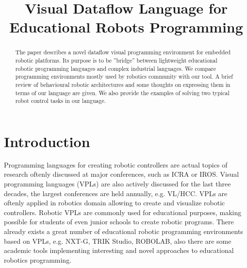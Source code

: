 \documentclass[conference,compsoc]{IEEEtran}
\begin{document}
\title{Visual Dataflow Language for Educational Robots Programming}

\author{
	\and

}

\maketitle



\begin{abstract}
The paper describes a novel dataflow visual programming environment for embedded robotic platforms. Its purpose is to be ''bridge'' between lightweight educational robotic programming languages and complex industrial languages. We compare programming environments mostly used by robotics community with our tool. A brief review of behavioural robotic architectures and some thoughts on expressing them in terms of our language are given. We also provide the examples of solving two typical robot control tasks in our language.
\end{abstract}

\section{Introduction}

Programming languages for creating robotic controllers are actual topics of research oftenly discussed at major conferences, such as ICRA\cite{Icra} or IROS\cite{Iros2016}. Visual programming languages (VPLs) are also actively discussed for the last three decades, the largest conferences are held annually, e.g. VL/HCC\cite{VLHCC}. VPLs are oftenly applied in robotics domain\cite{banyasad2000visual,simpson2006mobile,simpson2008visual,posso2011process,diprose2011ruru} allowing to create and visualize robotic controllers. Robotic VPLs are commonly used for educational purposes, making possible for students of even junior schools to create robotic programs. There already exists a great number of educational robotic programming environments based on VPLs, e.g. NXT-G\cite{nxtg}, TRIK Studio\cite{trik}, ROBOLAB\cite{robolab}, also there are some academic tools implementing interesting and novel approaches to educational robotics programming\cite{banyasad2000visual,simpson2008visual,diprose2011ruru}.
\end{document}
